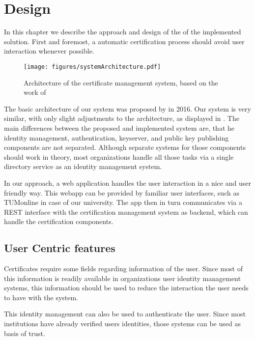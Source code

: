 \chapter{Design}\label{ch:design}

In this chapter we describe the approach and design of the of the implemented solution.
First and foremost, a automatic certification process should avoid user interaction whenever possible.

\begin{figure}
    \centering
    \texttt{[image: figures/systemArchitecture.pdf]}
    \caption{Architecture of the certificate management system, based on the work of \citet{jagdish2016certservice}}
    \label{fig:systemArchitecture}
\end{figure}

The basic architecture of our system was proposed by \citet{jagdish2016certservice} in 2016.
Our system is very similar, with only slight adjustments to the architecture, as displayed in
.
The main differences between the proposed and implemented system are, that he identity management, authentication,
keyserver, and public key publishing components are not separated.
Although separate systems for those components should work in theory, most organizations handle all those tasks via a
single directory service as an identity management system.

In our approach, a web application handles the user interaction in a nice and user friendly way.
This webapp can be provided by familiar user interfaces, such as TUMonline in case of our university.
The app then in turn communicates via a REST interface with the certification management system as backend, which can
handle the certification components.

\section{User Centric features}\label{sec:userDetails}
Certificates require some fields regarding information of the user. %
Since most of this information is readily available in organizations user identity management systems, this information
should be used to reduce the interaction the user needs to have with the system.

This identity management can also be used to authenticate the user. %
Since most institutions have already verified users identities, those systems can be used as basis of trust.

